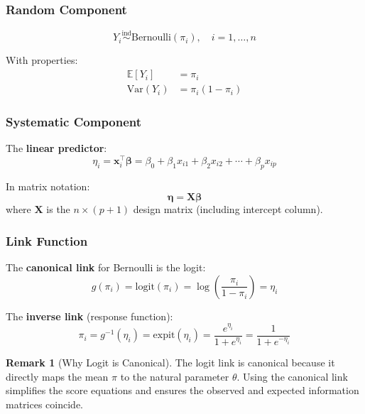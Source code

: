 \documentclass[11pt,letterpaper]{article}
\theoremstyle{definition}
\newtheorem{remark}{Remark}[section]
\newcommand{\E}{\mathbb{E}}
\newcommand{\Var}{\mathrm{Var}}
\newcommand{\X}{\mathbf{X}}
\newcommand{\bb}{\boldsymbol{\beta}}
\newcommand{\ee}{\boldsymbol{\eta}}
\newcommand{\expit}{\mathrm{expit}}
\newcommand{\logit}{\mathrm{logit}}
\begin{document}
\subsubsection{Random Component}

\begin{equation}
    Y_i \stackrel{\text{ind}}{\sim} \text{Bernoulli}(\pi_i), \quad i = 1, \ldots, n
\end{equation}

With properties:
\begin{align}
    \E[Y_i] &= \pi_i \\
    \Var(Y_i) &= \pi_i(1-\pi_i)
\end{align}

\subsubsection{Systematic Component}

The \textbf{linear predictor}:
\begin{equation}
    \eta_i = \mathbf{x}_i^\top \bb = \beta_0 + \beta_1 x_{i1} + \beta_2 x_{i2} + \cdots + \beta_p x_{ip}
\end{equation}

In matrix notation:
\begin{equation}
    \ee = \X\bb
\end{equation}
where $\X$ is the $n \times (p+1)$ design matrix (including intercept column).

\subsubsection{Link Function}

The \textbf{canonical link} for Bernoulli is the logit:
\begin{equation}
    g(\pi_i) = \logit(\pi_i) = \log\left(\frac{\pi_i}{1-\pi_i}\right) = \eta_i
    \label{eq:logit-link}
\end{equation}

The \textbf{inverse link} (response function):
\begin{equation}
    \pi_i = g^{-1}(\eta_i) = \expit(\eta_i) = \frac{e^{\eta_i}}{1 + e^{\eta_i}} = \frac{1}{1 + e^{-\eta_i}}
    \label{eq:expit}
\end{equation}

\begin{remark}[Why Logit is Canonical]
The logit link is canonical because it directly maps the mean $\pi$ to the natural parameter $\theta$. Using the canonical link simplifies the score equations and ensures the observed and expected information matrices coincide.
\end{remark}
\end{document}
